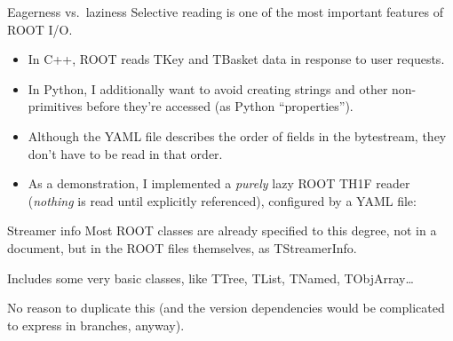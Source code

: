 \documentclass[aspectratio=169]{beamer}
\begin{document}
\begin{frame}{Eagerness vs.\ laziness}
\vspace{0.5 cm}
Selective reading is one of the most important features of ROOT I/O.
\begin{itemize}
\item In C++, ROOT reads TKey and TBasket data in response to user requests.
\item In Python, I additionally want to avoid creating strings and other non-primitives before they're accessed (as Python ``properties'').
\end{itemize}

\vspace{0.25 cm}
\begin{itemize}
\item<2-> Although the YAML file describes the order of fields in the bytestream, they don't have to be read in that order.
\item<3-> As a demonstration, I implemented a {\it purely} lazy ROOT TH1F reader ({\it nothing} is read until explicitly referenced), configured by a YAML file:
\end{itemize}
\begin{center}
\end{center}
\end{frame}

\begin{frame}{Streamer info}
Most ROOT classes are already specified to this degree, not in a document, but in the ROOT files themselves, as TStreamerInfo.

\vspace{0.5 cm}
Includes some very basic classes, like TTree, TList, TNamed, TObjArray\ldots

\vspace{0.5 cm}
No reason to duplicate this (and the version dependencies would be complicated to express in branches, anyway).
\end{frame}
\end{document}
